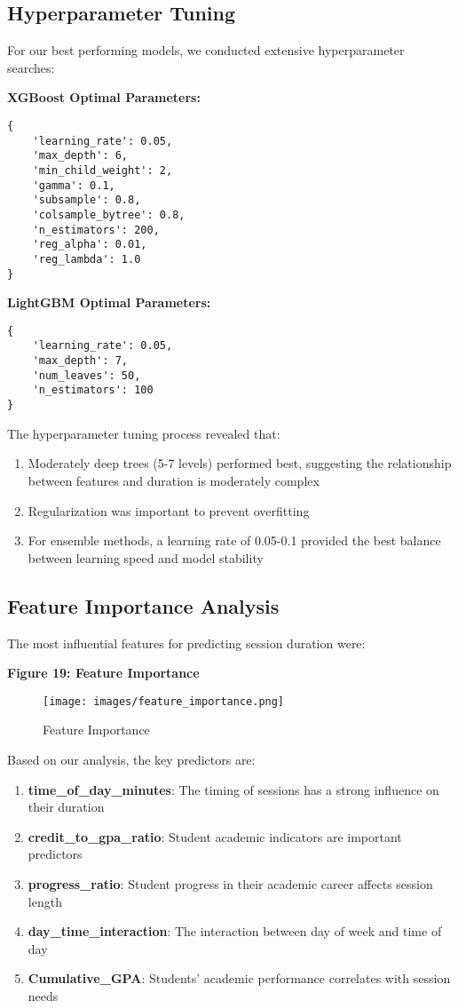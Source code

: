 \documentclass[12pt,letterpaper]{article}
\begin{document}
\subsection{Hyperparameter Tuning}

For our best performing models, we conducted extensive hyperparameter searches:

\textbf{XGBoost Optimal Parameters:}
\begin{verbatim}
{
    'learning_rate': 0.05,
    'max_depth': 6,
    'min_child_weight': 2,
    'gamma': 0.1,
    'subsample': 0.8,
    'colsample_bytree': 0.8,
    'n_estimators': 200,
    'reg_alpha': 0.01,
    'reg_lambda': 1.0
}
\end{verbatim}

\textbf{LightGBM Optimal Parameters:}
\begin{verbatim}
{
    'learning_rate': 0.05,
    'max_depth': 7,
    'num_leaves': 50,
    'n_estimators': 100
}
\end{verbatim}

The hyperparameter tuning process revealed that:
\begin{enumerate}
    \item Moderately deep trees (5-7 levels) performed best, suggesting the relationship between features and duration is moderately complex
    \item Regularization was important to prevent overfitting
    \item For ensemble methods, a learning rate of 0.05-0.1 provided the best balance between learning speed and model stability
\end{enumerate}

\subsection{Feature Importance Analysis}

The most influential features for predicting session duration were:

\textbf{Figure 19: Feature Importance}

\begin{figure}[H]
    \centering
    \texttt{[image: images/feature\_importance.png]}
    \caption{Feature Importance}
\end{figure}

Based on our analysis, the key predictors are:

\begin{enumerate}
    \item \textbf{time\_of\_day\_minutes}: The timing of sessions has a strong influence on their duration
    \item \textbf{credit\_to\_gpa\_ratio}: Student academic indicators are important predictors
    \item \textbf{progress\_ratio}: Student progress in their academic career affects session length
    \item \textbf{day\_time\_interaction}: The interaction between day of week and time of day
    \item \textbf{Cumulative\_GPA}: Students' academic performance correlates with session needs
\end{enumerate}
\end{document}
